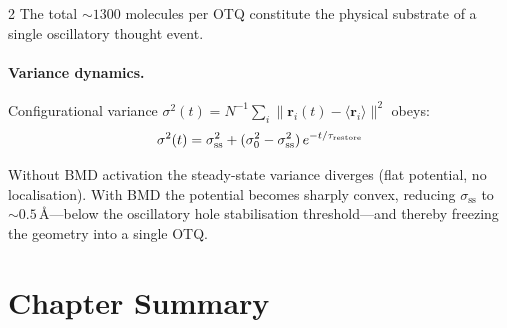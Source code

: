 \begin{multicols}{2}
The total $\sim\!1300$ molecules per OTQ constitute the physical substrate of a single oscillatory thought event.

\paragraph{Variance dynamics.}
Configurational variance $\sigma^2(t) = N^{-1}\sum_i\|\mathbf{r}_i(t) - \langle\mathbf{r}_i\rangle\|^2$ obeys:
\begin{equation}
\sigma^2(t) = \sigma_{\mathrm{ss}}^2 + (\sigma_0^2 - \sigma_{\mathrm{ss}}^2)\,e^{-t/\tau_{\mathrm{restore}}}
\end{equation}

Without BMD activation the steady-state variance diverges (flat potential, no localisation). With BMD the potential becomes sharply convex, reducing $\sigma_{\mathrm{ss}}$ to $\sim\!0.5\,\text{\AA}$---below the oscillatory hole stabilisation threshold---and thereby freezing the geometry into a single OTQ.

\end{multicols}

\section{Chapter Summary}

